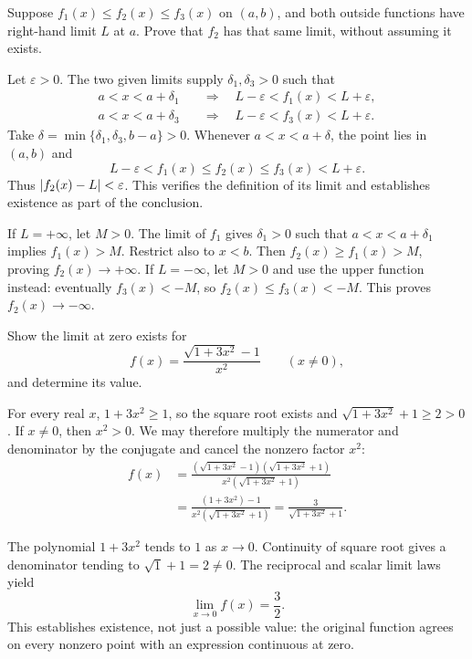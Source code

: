\goal Suppose $f_1(x)\le f_2(x)\le f_3(x)$ on $(a,b)$, and
both outside functions have right-hand limit $L$ at $a$.
Prove that $f_2$ has that same limit, without assuming it exists.

Let $\varepsilon>0$. The two given limits supply
$\delta_1,\delta_3>0$ such that
\[
 \begin{split}
 a<x<a+\delta_1&\quad\Longrightarrow\quad
             L-\varepsilon<f_1(x)<L+\varepsilon,\\
 a<x<a+\delta_3&\quad\Longrightarrow\quad
             L-\varepsilon<f_3(x)<L+\varepsilon.
 \end{split}
\]
Take $\delta=\min\{\delta_1,\delta_3,b-a\}>0$.
Whenever $a<x<a+\delta$, the point lies in $(a,b)$ and
\[
 L-\varepsilon<f_1(x)\le f_2(x)\le f_3(x)<L+\varepsilon.
\]
Thus $\left|f_2(x)-L\right|<\varepsilon$. This verifies the
definition of its limit and establishes existence as part
of the conclusion.

If $L=+\infty$, let $M>0$. The limit of $f_1$ gives
$\delta_1>0$ such that $a<x<a+\delta_1$ implies $f_1(x)>M$.
Restrict also to $x<b$. Then $f_2(x)\ge f_1(x)>M$, proving
$f_2(x)\to+\infty$.
If $L=-\infty$, let $M>0$ and use the upper function instead:
eventually $f_3(x)<-M$, so $f_2(x)\le f_3(x)<-M$.
This proves $f_2(x)\to-\infty$.

\goal Show the limit at zero exists for
\[
 f(x)=\frac{\sqrt{1+3x^2}-1}{x^2}\qquad(x\ne0),
\]
and determine its value.

For every real $x$, $1+3x^2\ge1$, so the square root exists
and $\sqrt{1+3x^2}+1\ge2>0$. If $x\ne0$, then $x^2>0$.
We may therefore multiply the numerator and denominator by the
conjugate and cancel the nonzero factor $x^2$:
\[
 \begin{aligned}
 f(x)&=\frac{(\sqrt{1+3x^2}-1)(\sqrt{1+3x^2}+1)}
             {x^2(\sqrt{1+3x^2}+1)}\\
 &=\frac{(1+3x^2)-1}{x^2(\sqrt{1+3x^2}+1)}
 =\frac3{\sqrt{1+3x^2}+1}.
 \end{aligned}
\]

The polynomial $1+3x^2$ tends to $1$ as $x\to0$.
Continuity of square root gives a denominator tending to
$\sqrt1+1=2\ne0$. The reciprocal and scalar limit laws yield
\[
 \lim_{x\to0}f(x)=\frac32.
\]
This establishes existence, not just a possible value: the
original function agrees on every nonzero point with an
expression continuous at zero.

